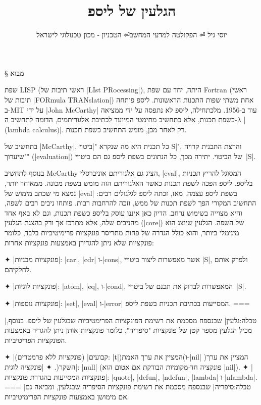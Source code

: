 \documentclass[a4paper,12pt,reqno]{article}
\title{הגלעין של ליספ}
\author{יוסי גיל ⏎ הפקולטה למדעי המחשב⏎ הטכניון - מכון טכנולוגי לישראל}
\begin{document}
\maketitle

§ מבוא

שפת LISP (ראשי תיבות של \E|LIst PRocessing|), היתה, יחד עם שפת Fortran (ראשי
תיבות של \E|FORmula TRANslation|) אחת משתי שפות התכנות הראשונות. ליספ פותחה
ב-MIT על ידי \E|John McCarthy| עוד ב-1956. מלכתחילה, ליספ לא נתפסה על ידי
ממציאה כשפת תכנות, אלא כתחשיב מתימטי המיועד לכתיבת אלגוריתמים, הדומה לתחשיב
ה-$λ$ \E|(lambda calculus)|. רק לאחר מכן, מומש התחשיב כשפת תכנות.

בתחשיב של \E|McCarthy|, כל תכנית היא מה שנקרא "\ע|ביטוי S|", והרצת התכנית קרויה
"שיערוך" (\E|evaluation|) של הביטוי. יתירה מכך, כל הנתונים בשפת ליספ גם הם
ביטויי~\E|S|.

בנוסף לתחשיב McCarthy הציג גם אלגוריתם אוניברסלי, \E|eval|, המסוגל להריץ תכניות
בליספ. ליספ הפכה לשפת תכנות כאשר האלגוריתם הזה מומש בשפת מכונה. ממאוחר יותר,
נמצא מי שכתב מימוש של \E|eval| בשפת ליספ עצמה. מאז, זכתה ליספ לגלגולים רבים:
התחשיב המקורי הפך לשפת תכנות של ממש, וזכה להרחבות רבות. פותחו ניבים רבים לשפה,
והיא מצוייה בשימוש נרחב. הדיון כאן איננו עוסק בליספ כשפת תכנות, וגם לא באף אחד
מהניבים שלה, אלא מתרכז אך ורק בהצגת הגלעין (\E|core|) של השפה. הגלעין שיוצג הוא
מינימלי ביותר, והוא כולל הגדרה של פחות מתריסר פונקציות פרימיטיביות בלבד, כלומר
פונקציות שלא ניתן להגדירן באמצעות פונקציות אחרות:

✦ \ע|פונקציות מבניות|: \E|car|, \E|cdr| ו-\E|cons|, אשר מאפשרות ליצור ביטויי
\E|S|, ולפרק אותם לחלקיהם.

✦ \ע|פונקציות לוגיות|: \E|atom|, \E|eq|, ו-\E|cond|, המאפשרות לבדוק את תכנם של
ביטויי~\E|S|.

✦ \ע|פונקציות נוספות|:  \E|set|, \E|eval| ו-\E|error| המסייעות בכתיבת
תכניות בשפת ליספ.
===

|טבלה:גלעין| שבנספח מסכמת את רשימת הפונקציות הפרימטיביות שבגלעין של ליספ.
בנוסף, מכיל הגלעין מספר קטן של פונקציות "סיפריה", כלומר פונקציות
אותן ניתן להגדיר באמצעות הפונקציות הפריטיביות.

✦ \ע|קבועים| (פונקציות ללא פרמטרים): \E|t|)המציין את ערך האמת(ו-\E|nil|
)המציין את ערך השקר(.
✦ \ע|פונקציה לוגית|: \E|null| (פונקציה חד-מקומיות הבודקת אם אטום הוא \E|nil|).
✦ \ע| פונקציות המסייעות בהגדרת פונקציות|:
\E|quote|, \E|defun|, \E|ndefun|, \E|lambda| ו-\E|nlambda|.
===
|טבלה:סיפריה| שבנספח מסכמת את רשימת פונקציות הסיפריה שבגלעין, ומביאה גם
אם מימושן באמצעות פונקציות הפרימיטיביות.
\end{document}
